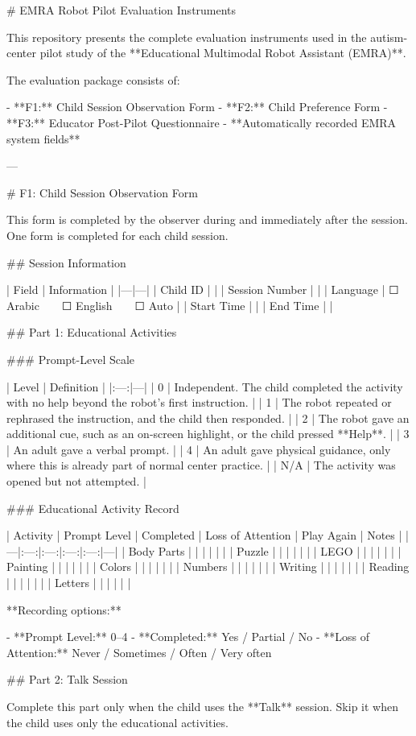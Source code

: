 # EMRA Robot Pilot Evaluation Instruments

This repository presents the complete evaluation instruments used in the autism-center pilot study of the **Educational Multimodal Robot Assistant (EMRA)**.

The evaluation package consists of:

- **F1:** Child Session Observation Form
- **F2:** Child Preference Form
- **F3:** Educator Post-Pilot Questionnaire
- **Automatically recorded EMRA system fields**

---

# F1: Child Session Observation Form

This form is completed by the observer during and immediately after the session. One form is completed for each child session.

## Session Information

| Field | Information |
|---|---|
| Child ID | |
| Session Number | |
| Language | ☐ Arabic  ☐ English  ☐ Auto |
| Start Time | |
| End Time | |

## Part 1: Educational Activities

### Prompt-Level Scale

| Level | Definition |
|:---:|---|
| 0 | Independent. The child completed the activity with no help beyond the robot’s first instruction. |
| 1 | The robot repeated or rephrased the instruction, and the child then responded. |
| 2 | The robot gave an additional cue, such as an on-screen highlight, or the child pressed **Help**. |
| 3 | An adult gave a verbal prompt. |
| 4 | An adult gave physical guidance, only where this is already part of normal center practice. |
| N/A | The activity was opened but not attempted. |

### Educational Activity Record

| Activity | Prompt Level | Completed | Loss of Attention | Play Again | Notes |
|---|:---:|:---:|:---:|:---:|---|
| Body Parts | | | | | |
| Puzzle | | | | | |
| LEGO | | | | | |
| Painting | | | | | |
| Colors | | | | | |
| Numbers | | | | | |
| Writing | | | | | |
| Reading | | | | | |
| Letters | | | | | |

**Recording options:**

- **Prompt Level:** 0–4
- **Completed:** Yes / Partial / No
- **Loss of Attention:** Never / Sometimes / Often / Very often

## Part 2: Talk Session

Complete this part only when the child uses the **Talk** session. Skip it when the child uses only the educational activities.

